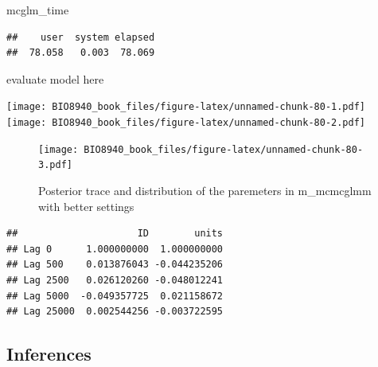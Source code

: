 \documentclass[
  12pt,
]{book}
\newenvironment{Shaded}{\begin{snugshade}}{\end{snugshade}}
\newcommand{\FunctionTok}[1]{\textcolor[rgb]{0.00,0.00,0.00}{#1}}
\newcommand{\NormalTok}[1]{#1}
\newcommand{\SpecialCharTok}[1]{\textcolor[rgb]{0.00,0.00,0.00}{#1}}
\begin{document}
\begin{Shaded}
\begin{Highlighting}[]
\NormalTok{mcglm\_time}
\end{Highlighting}
\end{Shaded}

\begin{verbatim}
##    user  system elapsed 
##  78.058   0.003  78.069
\end{verbatim}

evaluate model here

\begin{Shaded}
\end{Shaded}

\texttt{[image: BIO8940\_book\_files/figure-latex/unnamed-chunk-80-1.pdf]} \texttt{[image: BIO8940\_book\_files/figure-latex/unnamed-chunk-80-2.pdf]}

\begin{Shaded}
\end{Shaded}

\begin{figure}
\centering
\texttt{[image: BIO8940\_book\_files/figure-latex/unnamed-chunk-80-3.pdf]}
\caption{\label{fig:unnamed-chunk-80-3}Posterior trace and distribution of the paremeters in m\_mcmcglmm with better settings}
\end{figure}

\begin{Shaded}
\end{Shaded}

\begin{verbatim}
##                     ID        units
## Lag 0      1.000000000  1.000000000
## Lag 500    0.013876043 -0.044235206
## Lag 2500   0.026120260 -0.048012241
## Lag 5000  -0.049357725  0.021158672
## Lag 25000  0.002544256 -0.003722595
\end{verbatim}

\hypertarget{inferences-2}{%
\subsection{Inferences}\label{inferences-2}}
\end{document}
